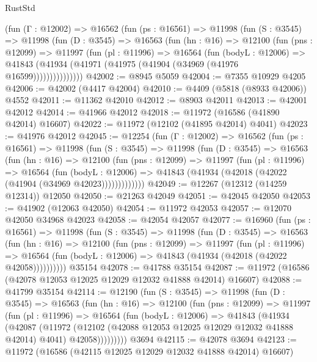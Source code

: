 \begin{lexlean}{RustStd}
\begin{coremodule}
      (fun (Γ : @12002) =>
      @16562
        (fun (ps : @16561) =>
        @11998
          (fun (S : @3545) =>
          @11998
            (fun (D : @3545) =>
            @16563
              (fun (hn : @16) =>
              @12100
                (fun (pns : @12099) =>
                @11997
                  (fun (pl : @11996) =>
                  @16564
                    (fun (bodyL : @12006) =>
                    @41843 (@41934 (@41971 (@41975 (@41904 (@34969 (@41976 @16599)))))))))))))))
@42002 := @8945 @5059
@42004 := @7355 @10929 @4205
@42006 := @42002 (@4417 @42004)
@42010 := @4409 (@5818 (@8933 @42006)) @4552
@42011 := @11362 @42010
@42012 := @8903 @42011
@42013 := @42001 @42012
@42014 := @41966 @42012
@42018 := @11972 (@16586 (@41890 @42014) @16607)
@42022 := @11972 (@12102 (@41895 @42014) @4041)
@42023 := @41976 @42012
@42045 := @12254
    (fun (Γ : @12002) =>
    @16562
      (fun (ps : @16561) =>
      @11998
        (fun (S : @3545) =>
        @11998
          (fun (D : @3545) =>
          @16563
            (fun (hn : @16) =>
            @12100
              (fun (pns : @12099) =>
              @11997
                (fun (pl : @11996) =>
                @16564
                  (fun (bodyL : @12006) =>
                  @41843 (@41934 (@42018 (@42022 (@41904 (@34969 @42023)))))))))))))
@42049 := @12267 (@12312 (@14259 @12314)) @12050
@42050 := @21263 @42049
@42051 := @42045 @42050
@42053 := @41902 (@12063 @42050)
@42054 := @11972 @42053
@42057 := @12070 @42050 @34968 @42023
@42058 := @42054 @42057
@42077 := @16960
    (fun (ps : @16561) =>
    @11998
      (fun (S : @3545) =>
      @11998
        (fun (D : @3545) =>
        @16563
          (fun (hn : @16) =>
          @12100
            (fun (pns : @12099) =>
            @11997
              (fun (pl : @11996) =>
              @16564 (fun (bodyL : @12006) => @41843 (@41934 (@42018 (@42022 @42058))))))))))
    @35154
@42078 := @41788 @35154
@42087 := @11972 (@16586 (@42078 @12053 @12025 @12029 @12032 @41888 @42014) @16607)
@42088 := @41799 @35154
@42114 := @12190
    (fun (S : @3545) =>
    @11998
      (fun (D : @3545) =>
      @16563
        (fun (hn : @16) =>
        @12100
          (fun (pns : @12099) =>
          @11997
            (fun (pl : @11996) =>
            @16564
              (fun (bodyL : @12006) =>
              @41843
                (@41934
                  (@42087
                    (@11972
                      (@12102 (@42088 @12053 @12025 @12029 @12032 @41888 @42014) @4041)
                      @42058)))))))))
    @3694
@42115 := @42078 @3694
@42123 := @11972 (@16586 (@42115 @12025 @12029 @12032 @41888 @42014) @16607)

\end{coremodule}
\end{lexlean}
